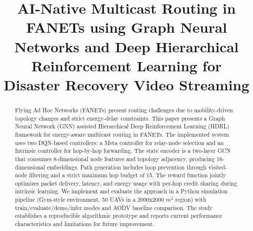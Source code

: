 \documentclass[conference]{IEEEtran}
\begin{document}
\title{AI-Native Multicast Routing in FANETs using Graph Neural Networks and Deep Hierarchical Reinforcement Learning for Disaster Recovery Video Streaming}

\author{
\and
{}
\and
{}
}

\maketitle

\begin{abstract}
Flying Ad Hoc Networks (FANETs) present routing challenges due to mobility-driven topology changes and strict energy-delay constraints. This paper presents a Graph Neural Network (GNN) assisted Hierarchical Deep Reinforcement Learning (HDRL) framework for energy-aware multicast routing in FANETs. The implemented system uses two DQN-based controllers: a Meta controller for relay-node selection and an Intrinsic controller for hop-by-hop forwarding. The state encoder is a two-layer GCN that consumes 8-dimensional node features and topology adjacency, producing 16-dimensional embeddings. Path generation includes loop prevention through visited-node filtering and a strict maximum hop budget of 15. The reward function jointly optimizes packet delivery, latency, and energy usage with per-hop credit sharing during intrinsic learning. We implement and evaluate the approach in a Python simulation pipeline (Gym-style environment, 50 UAVs in a 2000x2000 $m^2$ region) with train/evaluate/demo/infer modes and AODV baseline comparison. The study establishes a reproducible algorithmic prototype and reports current performance characteristics and limitations for future improvement.
\end{abstract}
\end{document}
